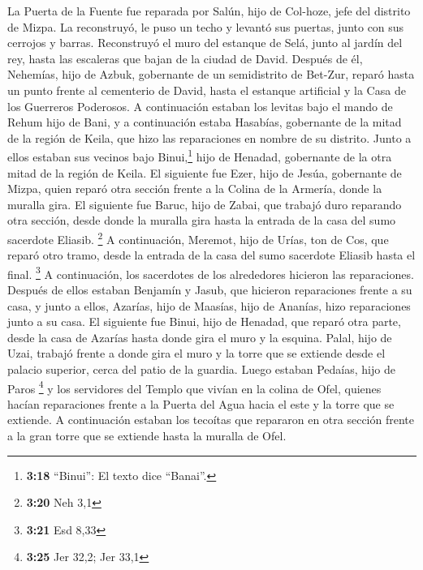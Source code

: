  La Puerta de la Fuente fue reparada por Salún, hijo de
Col-hoze, jefe del distrito de Mizpa. La reconstruyó, le puso un techo y
levantó sus puertas, junto con sus cerrojos y barras. Reconstruyó el
muro del estanque de Selá, junto al jardín del rey, hasta las escaleras
que bajan de la ciudad de David.  Después de él,
Nehemías, hijo de Azbuk, gobernante de un semidistrito de Bet-Zur,
reparó hasta un punto frente al cementerio de David, hasta el estanque
artificial y la Casa de los Guerreros Poderosos.  A
continuación estaban los levitas bajo el mando de Rehum hijo de Bani, y
a continuación estaba Hasabías, gobernante de la mitad de la región de
Keila, que hizo las reparaciones en nombre de su distrito.
 Junto a ellos estaban sus vecinos bajo Binui,\footnote{\textbf{3:18}
  ``Binui'': El texto dice ``Banai''.} hijo de Henadad, gobernante de la
otra mitad de la región de Keila.  El siguiente fue Ezer,
hijo de Jesúa, gobernante de Mizpa, quien reparó otra sección frente a
la Colina de la Armería, donde la muralla gira.  El
siguiente fue Baruc, hijo de Zabai, que trabajó duro reparando otra
sección, desde donde la muralla gira hasta la entrada de la casa del
sumo sacerdote Eliasib. \footnote{\textbf{3:20} Neh 3,1} 
A continuación, Meremot, hijo de Urías, ton de Cos, que reparó otro
tramo, desde la entrada de la casa del sumo sacerdote Eliasib hasta el
final. \footnote{\textbf{3:21} Esd 8,33}  A continuación,
los sacerdotes de los alrededores hicieron las reparaciones.
 Después de ellos estaban Benjamín y Jasub, que hicieron
reparaciones frente a su casa, y junto a ellos, Azarías, hijo de
Maasías, hijo de Ananías, hizo reparaciones junto a su casa.
 El siguiente fue Binui, hijo de Henadad, que reparó otra
parte, desde la casa de Azarías hasta donde gira el muro y la esquina.
 Palal, hijo de Uzai, trabajó frente a donde gira el muro
y la torre que se extiende desde el palacio superior, cerca del patio de
la guardia. Luego estaban Pedaías, hijo de Paros \footnote{\textbf{3:25}
  Jer 32,2; Jer 33,1}  y los servidores del Templo que
vivían en la colina de Ofel, quienes hacían reparaciones frente a la
Puerta del Agua hacia el este y la torre que se extiende.
 A continuación estaban los tecoítas que repararon en
otra sección frente a la gran torre que se extiende hasta la muralla de
Ofel.

